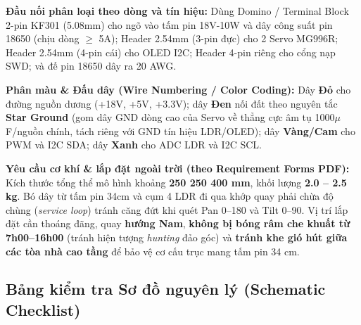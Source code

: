 \documentclass[12pt,a4paper]{report}
\begin{document}
\textbf{Đầu nối phân loại theo dòng và tín hiệu:} Dùng Domino / Terminal Block 2-pin KF301 (5.08mm) cho ngõ vào tấm pin 18V-10W và dây công suất pin 18650 (chịu dòng \ensuremath{\ge} 5A); Header 2.54mm (3-pin đực) cho 2 Servo MG996R; Header 2.54mm (4-pin cái) cho OLED I2C; Header 4-pin riêng cho cổng nạp SWD; và đế pin 18650 dây ra 20 AWG.

\textbf{Phân màu \& Đấu dây (Wire Numbering / Color Coding):} Dây \textbf{Đỏ} cho đường nguồn dương (+18V, +5V, +3.3V); dây \textbf{Đen} nối đất theo nguyên tắc \textbf{Star Ground} (gom dây GND dòng cao của Servo về thẳng cực âm tụ 1000\ensuremath{\mu}F/nguồn chính, tách riêng với GND tín hiệu LDR/OLED); dây \textbf{Vàng/Cam} cho PWM và I2C SDA; dây \textbf{Xanh} cho ADC LDR và I2C SCL.

\textbf{Yêu cầu cơ khí \& lắp đặt ngoài trời (theo Requirement Forms PDF):} Kích thước tổng thể mô hình khoảng \textbf{250 \texttimes{} 250 \texttimes{} 400 mm}, khối lượng \textbf{2.0 -- 2.5 kg}. Bó dây từ tấm pin 34cm và cụm 4 LDR đi qua khớp quay phải chừa độ chùng (\textit{service loop}) tránh căng đứt khi quét Pan 0\textdegree{}--180\textdegree{} và Tilt 0\textdegree{}--90\textdegree{}. Vị trí lắp đặt cần thoáng đãng, quay \textbf{hướng Nam}, \textbf{không bị bóng râm che khuất từ 7h00--16h00} (tránh hiện tượng \textit{hunting} đảo góc) và \textbf{tránh khe gió hút giữa các tòa nhà cao tầng} để bảo vệ cơ cấu trục mang tấm pin 34 cm.

\subsection{Bảng kiểm tra Sơ đồ nguyên lý (Schematic Checklist)}
\end{document}
